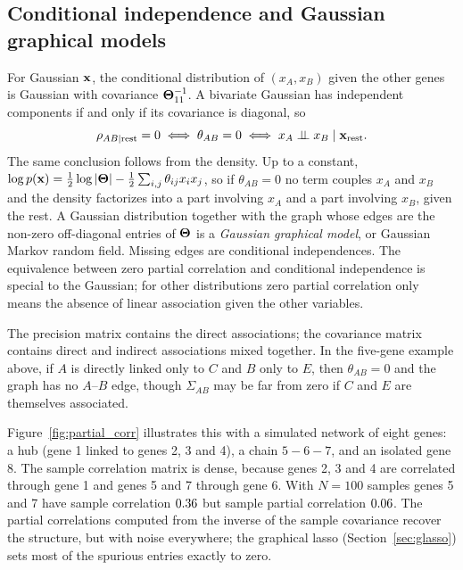 \subsection{Conditional independence and Gaussian graphical models}

For Gaussian $\mathbf{x}$, the conditional distribution of $(x_A,x_B)$ given the other genes is Gaussian with covariance $\boldsymbol{\Theta}_{11}^{-1}$. A bivariate Gaussian has independent components if and only if its covariance is diagonal, so
\begin{equation}
  \rho_{AB\mid\text{rest}}=0 \iff \theta_{AB}=0 \iff x_A\perp\!\!\!\perp x_B\mid \mathbf{x}_{\text{rest}} .
\end{equation}
The same conclusion follows from the density. Up to a constant, $\log p(\mathbf{x}) = \frac12\log|\boldsymbol{\Theta}| - \frac12\sum_{i,j}\theta_{ij}x_ix_j$, so if $\theta_{AB}=0$ no term couples $x_A$ and $x_B$ and the density factorizes into a part involving $x_A$ and a part involving $x_B$, given the rest. A Gaussian distribution together with the graph whose edges are the non-zero off-diagonal entries of $\boldsymbol{\Theta}$ is a \emph{Gaussian graphical model}, or Gaussian Markov random field. Missing edges are conditional independences. The equivalence between zero partial correlation and conditional independence is special to the Gaussian; for other distributions zero partial correlation only means the absence of linear association given the other variables.

The precision matrix contains the direct associations; the covariance matrix contains direct and indirect associations mixed together. In the five-gene example above, if $A$ is directly linked only to $C$ and $B$ only to $E$, then $\theta_{AB}=0$ and the graph has no $A$--$B$ edge, though $\Sigma_{AB}$ may be far from zero if $C$ and $E$ are themselves associated.

Figure~\ref{fig:partial_corr} illustrates this with a simulated network of eight genes: a hub (gene 1 linked to genes 2, 3 and 4), a chain $5-6-7$, and an isolated gene 8. The sample correlation matrix is dense, because genes 2, 3 and 4 are correlated through gene 1 and genes 5 and 7 through gene 6. With $N=100$ samples genes 5 and 7 have sample correlation $0.36$ but sample partial correlation $0.06$. The partial correlations computed from the inverse of the sample covariance recover the structure, but with noise everywhere; the graphical lasso (Section~\ref{sec:glasso}) sets most of the spurious entries exactly to zero.

